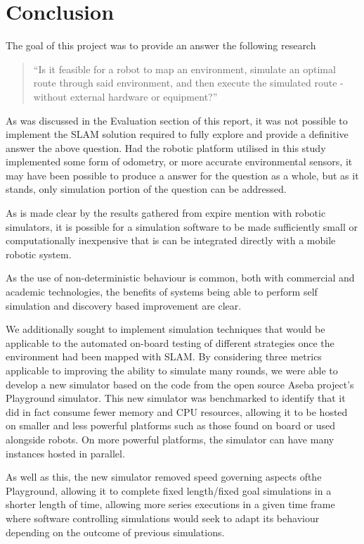 \section{Conclusion}
The goal of this project was to provide an answer the following research
\begin{quote}
``Is it feasible for a robot to map an environment, simulate an optimal route
through said environment, and then execute the simulated route - without
external hardware or equipment?'' 
\end{quote}
As was discussed in the Evaluation section of this report, it was not possible
to implement the SLAM solution required to fully explore and provide a
definitive answer the above question.
Had the robotic platform utilised in this study implemented some form of
odometry, or more accurate environmental sensors, it may have been possible to
produce a answer for the question as a whole, but as it stands, only
simulation portion of the question can be addressed.


As is made clear by the results gathered from expire mention with robotic
simulators, it is possible for a simulation software to be made sufficiently
small or computationally inexpensive that is can be integrated directly with a
mobile robotic system.



As the use of non-deterministic behaviour is common, both with commercial
and academic technologies, the benefits of systems being able to perform self
simulation and discovery based improvement are clear.

We additionally sought to implement simulation techniques that would be
applicable to the automated on-board testing of different strategies once the
environment had been mapped with SLAM. By considering three metrics applicable
to improving the ability to simulate many rounds, we were able to develop a new
simulator based on the code from the open source Aseba project's Playground
simulator. This new simulator was benchmarked to identify that it did in fact
consume fewer memory and CPU resources, allowing it to be hosted on smaller and
less powerful platforms such as those found on board or used alongside robots.
On more powerful platforms, the simulator can have many instances hosted in
parallel.

As well as this, the new simulator removed speed governing aspects ofthe
Playground, allowing it to complete fixed length/fixed goal simulations in a
shorter length of time, allowing more series executions in a given time frame
where software controlling simulations would seek to adapt its behaviour
depending on the outcome of previous simulations.
